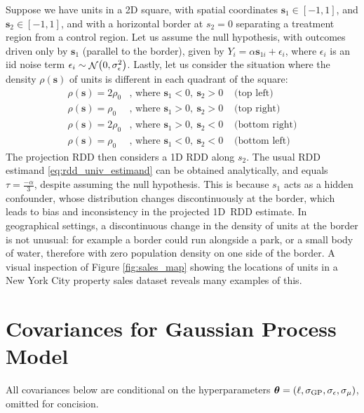 \documentclass[letter]{article}
\DeclarePairedDelimiter{\parenthesis}{\lparen}{\rparen}
\newcommand{\del}[1]{\parenthesis*{#1}}
\DeclareMathOperator{\normal}{\mathcal{N}}
\newcommand{\sigmaf}{\sigma_{\mathrm{GP}}}
\newcommand{\sigman}{\sigma_{\epsilon}}
\newcommand{\sigmamu}{\sigma_{\mu}}
\newcommand{\svec}{\mathbold{s}}
\newcommand{\hyperparam}{\bm{\theta}}
\begin{document}
    	Suppose we have units in a 2D square, with spatial coordinates \(\svec_1 \in [-1,1]\), and \(\svec_2 \in [-1,1]\), and with a horizontal border at \(s_2=0\) separating a treatment region from a control region.
Let us assume the null hypothesis, with outcomes driven only by \(\svec_1\) (parallel to the border), given by \(Y_{i} = \alpha \svec_{1i} + \epsilon_i\),
where \(\epsilon_i\) is an iid noise term \(\epsilon_i \sim \normal\del{0, \sigman^2}\).
Lastly, let us consider the situation where the density \(\rho(\svec)\) of units is different in each quadrant of the square:
\begin{equation}
\begin{aligned}
    \rho(\svec) = 2\rho_0 & \text{, where }\svec_1 < 0,~\svec_2 > 0 & \text{ (top left)} \\
    \rho(\svec) = \rho_0 & \text{, where }\svec_1 > 0,~\svec_2 > 0 & \text{ (top right)} \\
    \rho(\svec) = 2\rho_0 & \text{, where }\svec_1 > 0,~\svec_2 < 0 & \text{ (bottom right)}  \\
    \rho(\svec) = \rho_0 & \text{, where }\svec_1 < 0,~\svec_2 < 0 & \text{ (bottom left)}
\end{aligned}
\end{equation}
The projection RDD then considers a 1D RDD along \(s_2\).
The usual RDD estimand \eqref{eq:rdd_univ_estimand} can be obtained analytically, and equals \(\tau=\frac{-\alpha}{3}\), despite assuming the null hypothesis.
This is because \(s_1\) acts as a hidden confounder, whose distribution changes discontinuously at the border, which leads to bias and inconsistency in the projected 1D~RDD estimate.
In geographical settings, a discontinuous change in the density of units at the border is not unusual: for example a border could run alongside a park, or a small body of water, therefore with zero population density on one side of the border.
A visual inspection of Figure \ref{fig:sales_map} showing the locations of units in a New York City property sales dataset reveals many examples of this.
    


    	\hypertarget{covariances-for-gaussian-process-model}{%
\section{Covariances for Gaussian Process Model}\label{covariances-for-gaussian-process-model}}
    

\label{sec:covariances}
    	All covariances below are conditional on the hyperparameters \(\hyperparam = \del{\ell,\sigmaf, \sigman, \sigmamu}\), omitted for concision.
    
\end{document}
